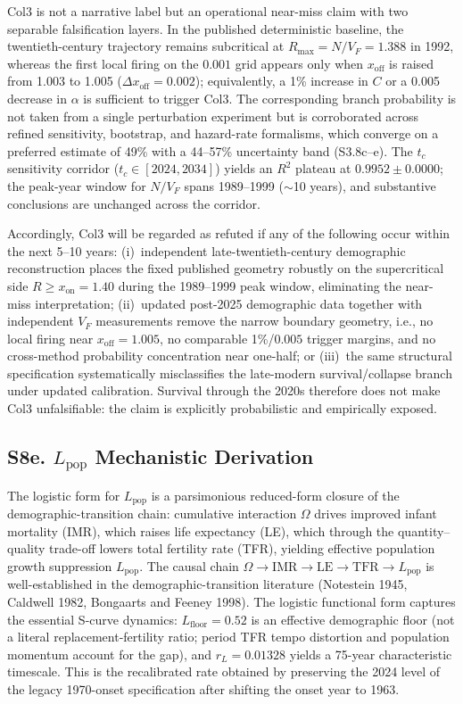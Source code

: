 \documentclass[11pt]{article}
\begin{document}
Col3 is not a narrative label but an operational near-miss claim with two separable falsification layers.
In the published deterministic baseline, the twentieth-century trajectory remains subcritical at $R_{\max}=N/V_F=1.388$ in 1992, whereas the first local firing on the $0.001$ grid appears only when $x_{\mathrm{off}}$ is raised from 1.003 to 1.005 ($\Delta x_{\mathrm{off}}=0.002$); equivalently, a 1\% increase in $C$ or a 0.005 decrease in $\alpha$ is sufficient to trigger Col3.
The corresponding branch probability is not taken from a single perturbation experiment but is corroborated across refined sensitivity, bootstrap, and hazard-rate formalisms, which converge on a preferred estimate of 49\% with a 44--57\% uncertainty band (S3.8c--e).
The $t_c$ sensitivity corridor ($t_c\in[2024,2034]$) yields an $R^2$ plateau at $0.9952\pm 0.0000$; the peak-year window for $N/V_F$ spans 1989--1999 ($\sim$10 years), and substantive conclusions are unchanged across the corridor.

Accordingly, Col3 will be regarded as refuted if any of the following occur within the next 5--10 years:
(i)~independent late-twentieth-century demographic reconstruction places the fixed published geometry robustly on the supercritical side $R\ge x_{\mathrm{on}}=1.40$ during the 1989--1999 peak window, eliminating the near-miss interpretation;
(ii)~updated post-2025 demographic data together with independent $V_F$ measurements remove the narrow boundary geometry, i.e., no local firing near $x_{\mathrm{off}}=1.005$, no comparable 1\%/$0.005$ trigger margins, and no cross-method probability concentration near one-half; or
(iii)~the same structural specification systematically misclassifies the late-modern survival/collapse branch under updated calibration.
Survival through the 2020s therefore does not make Col3 unfalsifiable: the claim is explicitly probabilistic and empirically exposed.

\subsection*{S8e. $L_{\mathrm{pop}}$ Mechanistic Derivation}

The logistic form for $L_{\mathrm{pop}}$ is a
parsimonious reduced-form closure of the demographic-transition chain:
cumulative interaction $\Omega$ drives improved infant mortality (IMR), which raises
life expectancy (LE), which through the quantity--quality trade-off lowers total fertility
rate (TFR), yielding effective population growth suppression $L_{\mathrm{pop}}$.
The causal chain $\Omega\to\mathrm{IMR}\to\mathrm{LE}\to\mathrm{TFR}\to L_{\mathrm{pop}}$
is well-established in the demographic-transition literature
(Notestein 1945, Caldwell 1982, Bongaarts and Feeney 1998).
The logistic functional form captures the essential S-curve dynamics:
$L_{\mathrm{floor}}=0.52$ is an effective demographic floor (not a literal replacement-fertility
ratio; period TFR tempo distortion and population momentum account for the gap),
and $r_L=0.01328$ yields a 75-year characteristic timescale. This is the
recalibrated rate obtained by preserving the 2024 level of the legacy
1970-onset specification after shifting the onset year to 1963.
\end{document}

